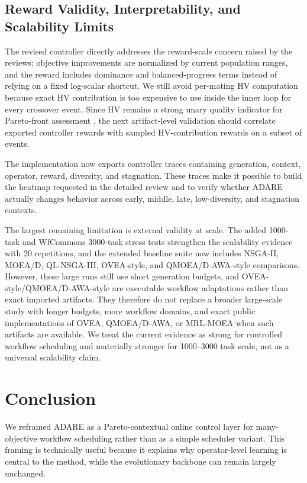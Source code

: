\documentclass[preprint,12pt]{elsarticle}
\begin{document}
\subsection{Reward Validity, Interpretability, and Scalability Limits}
The revised controller directly addresses the reward-scale concern raised by the reviews: objective improvements are normalized by current population ranges, and the reward includes dominance and balanced-progress terms instead of relying on a fixed log-scalar shortcut. We still avoid per-mating HV computation because exact HV contribution is too expensive to use inside the inner loop for every crossover event. Since HV remains a strong unary quality indicator for Pareto-front assessment \cite{zitzler2003performance}, the next artifact-level validation should correlate exported controller rewards with sampled HV-contribution rewards on a subset of events.

The implementation now exports controller traces containing generation, context, operator, reward, diversity, and stagnation. These traces make it possible to build the heatmap requested in the detailed review and to verify whether ADARE actually changes behavior across early, middle, late, low-diversity, and stagnation contexts.

The largest remaining limitation is external validity at scale. The added 1000-task and WfCommons 3000-task stress tests strengthen the scalability evidence with 20 repetitions, and the extended baseline suite now includes NSGA-II, MOEA/D, QL-NSGA-III, OVEA-style, and QMOEA/D-AWA-style comparisons. However, these large runs still use short generation budgets, and OVEA-style/QMOEA/D-AWA-style are executable workflow adaptations rather than exact imported artifacts. They therefore do not replace a broader large-scale study with longer budgets, more workflow domains, and exact public implementations of OVEA, QMOEA/D-AWA, or MRL-MOEA when such artifacts are available. We treat the current evidence as strong for controlled workflow scheduling and materially stronger for 1000--3000 task scale, not as a universal scalability claim.
\section{Conclusion}
We reframed ADARE as a Pareto-contextual online control layer for many-objective workflow scheduling rather than as a simple scheduler variant. This framing is technically useful because it explains why operator-level learning is central to the method, while the evolutionary backbone can remain largely unchanged.
\end{document}
